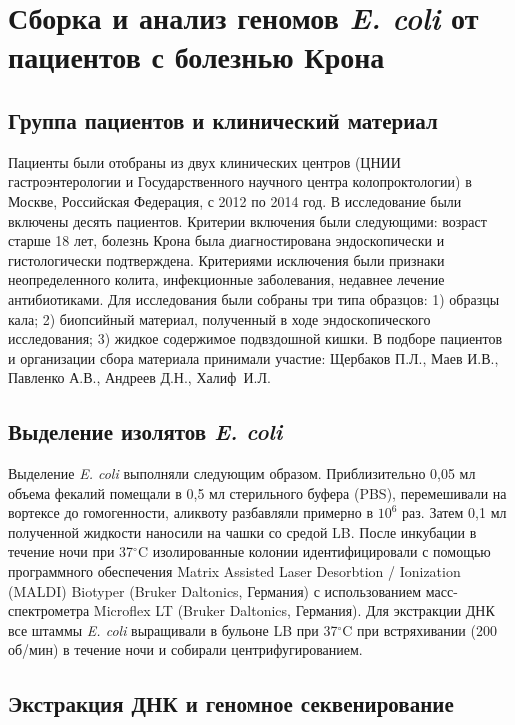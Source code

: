 \section{Сборка и анализ геномов \textit{E. coli} от пациентов с болезнью Крона}

\subsection{Группа пациентов и клинический материал}
Пациенты были отобраны из двух клинических центров (ЦНИИ гастроэнтерологии и Государственного научного центра колопроктологии) в Москве, Российская Федерация, с 2012 по 2014 год. В исследование были включены десять пациентов. Критерии включения были следующими: возраст старше 18 лет, болезнь Крона была диагностирована эндоскопически и гистологически подтверждена. Критериями исключения были признаки неопределенного колита, инфекционные заболевания, недавнее лечение антибиотиками. 
Для исследования были собраны три типа образцов: 1) образцы кала; 2) биопсийный материал, полученный в ходе эндоскопического исследования; 3) жидкое содержимое подвздошной кишки. В подборе пациентов и организации сбора материала принимали участие: Щербаков П.Л., Маев И.В., Павленко А.В., Андреев Д.Н., Халиф~И.Л.

\subsection{Выделение изолятов \textit{E. coli}}

Выделение \textit{E. coli} выполняли следующим образом. Приблизительно 0,05 мл объема фекалий помещали в 0,5 мл стерильного буфера (PBS), перемешивали на вортексе до гомогенности, аликвоту разбавляли примерно в $10^6$ раз. Затем 0,1 мл полученной жидкости наносили на чашки со средой LB. После инкубации в течение ночи при 37$^\circ$C изолированные колонии идентифицировали с помощью программного обеспечения Matrix Assisted Laser Desorbtion / Ionization (MALDI) Biotyper (Bruker Daltonics, Германия) с использованием масс-спектрометра Microflex LT (Bruker Daltonics, Германия). Для экстракции ДНК все штаммы \textit{E. coli} выращивали в бульоне LB при 37$^\circ$C при встряхивании (200 об/мин) в течение ночи и собирали центрифугированием. 

\subsection{Экстракция ДНК и геномное секвенирование}

